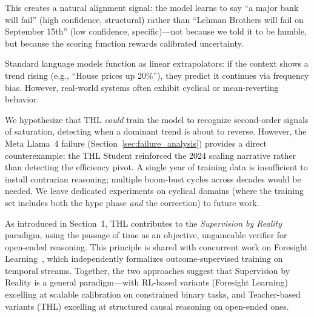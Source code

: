 \documentclass[11pt,a4paper]{article}
\begin{document}
This creates a natural alignment signal: the model learns to say ``a major bank will fail'' (high confidence, structural) rather than ``Lehman Brothers will fail on September 15th'' (low confidence, specific)---not because we told it to be humble, but because the scoring function rewards calibrated uncertainty.

Standard language models function as linear extrapolators: if the context shows a trend rising (e.g., ``House prices up 20\%''), they predict it continues via frequency bias. However, real-world systems often exhibit cyclical or mean-reverting behavior.

We hypothesize that THL \textit{could} train the model to recognize second-order signals of saturation, detecting when a dominant trend is about to reverse. However, the Meta Llama~4 failure (Section~\ref{sec:failure_analysis}) provides a direct counterexample: the THL Student reinforced the 2024 scaling narrative rather than detecting the efficiency pivot. A single year of training data is insufficient to install contrarian reasoning; multiple boom-bust cycles across decades would be needed. We leave dedicated experiments on cyclical domains (where the training set includes both the hype phase \textit{and} the correction) to future work.

As introduced in Section~1, THL contributes to the \emph{Supervision by Reality} paradigm, using the passage of time as an objective, ungameable verifier for open-ended reasoning. This principle is shared with concurrent work on Foresight Learning~\cite{turtel2026futureaslabel, turtel2026sec}, which independently formalizes outcome-supervised training on temporal streams. Together, the two approaches suggest that Supervision by Reality is a general paradigm---with RL-based variants (Foresight Learning) excelling at scalable calibration on constrained binary tasks, and Teacher-based variants (THL) excelling at structured causal reasoning on open-ended ones.
\end{document}
